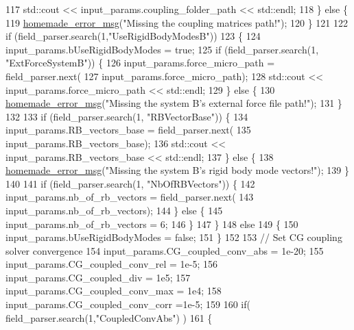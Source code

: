 \begin{DoxyCode}
117         std::cout << input\_params.coupling\_folder\_path << std::endl;
118     \} \textcolor{keywordflow}{else} \{
119         \hyperlink{common__header_8h_a05d65d26b911668ac90085745dca71f6}{homemade\_error\_msg}(\textcolor{stringliteral}{"Missing the coupling matrices path!"});
120     \}
121 
122     \textcolor{keywordflow}{if} (field\_parser.search(1,\textcolor{stringliteral}{"UseRigidBodyModesB"}))
123     \{
124         input\_params.bUseRigidBodyModes = \textcolor{keyword}{true};
125         \textcolor{keywordflow}{if} (field\_parser.search(1, \textcolor{stringliteral}{"ExtForceSystemB"})) \{
126             input\_params.force\_micro\_path = field\_parser.next(
127                     input\_params.force\_micro\_path);
128             std::cout << input\_params.force\_micro\_path << std::endl;
129         \} \textcolor{keywordflow}{else} \{
130             \hyperlink{common__header_8h_a05d65d26b911668ac90085745dca71f6}{homemade\_error\_msg}(\textcolor{stringliteral}{"Missing the system B's external force file path!"});
131         \}
132 
133         \textcolor{keywordflow}{if} (field\_parser.search(1, \textcolor{stringliteral}{"RBVectorBase"})) \{
134             input\_params.RB\_vectors\_base = field\_parser.next(
135                     input\_params.RB\_vectors\_base);
136             std::cout << input\_params.RB\_vectors\_base << std::endl;
137         \} \textcolor{keywordflow}{else} \{
138             \hyperlink{common__header_8h_a05d65d26b911668ac90085745dca71f6}{homemade\_error\_msg}(\textcolor{stringliteral}{"Missing the system B's rigid body mode vectors!"});
139         \}
140         
141         \textcolor{keywordflow}{if} (field\_parser.search(1, \textcolor{stringliteral}{"NbOfRBVectors"})) \{
142             input\_params.nb\_of\_rb\_vectors = field\_parser.next(
143                     input\_params.nb\_of\_rb\_vectors);
144         \} \textcolor{keywordflow}{else} \{
145             input\_params.nb\_of\_rb\_vectors = 6;
146         \}
147     \}
148     \textcolor{keywordflow}{else}
149     \{
150         input\_params.bUseRigidBodyModes = \textcolor{keyword}{false};
151     \}
152 
153     \textcolor{comment}{// Set CG coupling solver convergence}
154     input\_params.CG\_coupled\_conv\_abs = 1e-20;
155     input\_params.CG\_coupled\_conv\_rel = 1e-5;
156     input\_params.CG\_coupled\_div = 1e5;
157     input\_params.CG\_coupled\_conv\_max = 1e4;
158     input\_params.CG\_coupled\_conv\_corr =1e-5;
159 
160     \textcolor{keywordflow}{if}( field\_parser.search(1,\textcolor{stringliteral}{"CoupledConvAbs"}) )
161     \{

\end{DoxyCode}
